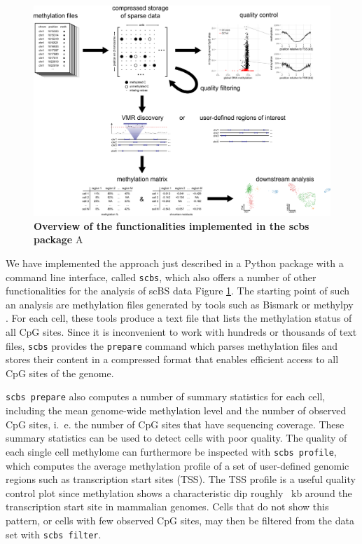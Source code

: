 \documentclass[twocolumn,10pt]{article}
\begin{document}
\begin{figure}
	\includegraphics[width=\columnwidth]{figures/Fig_workflow.png}
	\caption{\small \textbf{Overview of the functionalities implemented in the scbs package}
	A 
	}
	\label{workflow}
\end{figure}

We have implemented the approach just described in a Python package with a command line interface, called \texttt{scbs}, which also offers a number of other functionalities for the analysis of scBS data Figure \ref{workflow}. The starting point of such an analysis are methylation files generated by tools such as Bismark \citep{bismark} or methylpy \citep{methylpy}. For each cell, these tools produce a text file that lists the methylation status of all CpG sites. Since it is inconvenient to work with hundreds or thousands of text files, \texttt{scbs} provides the \texttt{prepare} command which parses methylation files and stores their content in a compressed format that enables efficient access to all CpG sites of the genome.

\texttt{scbs prepare} also computes a number of summary statistics for each cell, including the mean genome-wide methylation level and the number of observed CpG sites, i.~e. the number of CpG sites that have sequencing coverage. These summary statistics can be used to detect cells with poor quality. The quality of each single cell methylome can furthermore be inspected with \texttt{scbs profile}, which computes the average methylation profile of a set of user-defined genomic regions such as transcription start sites (TSS). The TSS profile is a useful quality control plot since methylation shows a characteristic dip roughly ~kb around the transcription start site in mammalian genomes. Cells that do not show this pattern, or cells with few observed CpG sites, may then be filtered from the data set with \texttt{scbs filter}. 
\end{document}
